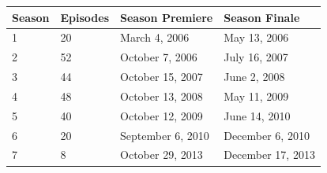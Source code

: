 \documentclass{article}
\begin{document}
\begin{tabular}{llll}
\toprule
Season & Episodes & Season Premiere & Season Finale \\
\midrule
1 & 20 & March 4, 2006 & May 13, 2006 \\
2 & 52 & October 7, 2006 & July 16, 2007 \\
3 & 44 & October 15, 2007 & June 2, 2008 \\
4 & 48 & October 13, 2008 & May 11, 2009 \\
5 & 40 & October 12, 2009 & June 14, 2010 \\
6 & 20 & September 6, 2010 & December 6, 2010 \\
7 & 8 & October 29, 2013 & December 17, 2013 \\
\bottomrule
\end{tabular}
\end{document}
